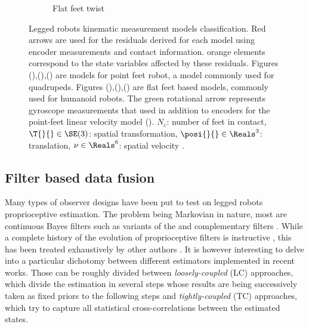 \begin{figure}
\begin{subfigure}{.33\linewidth}
        \caption{Flat feet twist}
        \label{fig:kin_flat_vel}
    \end{subfigure}%
    \caption{Legged robots kinematic measurement models classification. Red arrows are used for the residuals derived for each model using encoder measurements and contact information. 
    orange elements correspond to the state variables affected by these residuals. Figures (),(),() are models
    for point feet robot, a model commonly used for quadrupeds. Figures (),(),() are flat feet based models,
    commonly used for humanoid robots. The green rotational arrow represents gyroscope measurements that used in addition to encoders for the point-feet linear velocity model ().
    $N_c$: number of feet in contact, $\T{}{} \in \SE(3)$: spatial transformation, $\posi{}{} \in \Reals^3$: translation, $\nu \in \Reals^6$: spatial velocity \cite{featherstone2014rigid}. 
        }
    \label{fig:kin_models}
\end{figure}


\subsection{Filter based data fusion}
\label{sec:proprio_filters}

Many types of observer designs have been put to test on legged robots proprioceptive estimation. The problem being Markovian in nature,
most are continuous Bayes filters such as variants of the \KalmanF \cite{kalman1960new} and complementary filters \cite{higgins1975comparison}. While a complete history of 
the evolution of proprioceptive filters is instructive 
\cite{gassmann2005localization, lin2005leg, lin2006sensor, cobano2008location, aoustin2008experimental, lebastard2011estimation, chilian2011multisensor, reinstein2011dead, 
gur2012model, ma2012robust, gorner2013leg}, 
this has been treated exhaustively by other authors \cite{bloesch2017state, camurri2017multisensory}. 
It is however interesting to delve into a particular dichotomy between different estimators implemented in recent works. Those can be 
roughly divided between \textit{loosely-coupled} (LC) approaches, which divide the estimation in several steps whose results are being successively taken as fixed priors to the 
following steps and \textit{tightly-coupled} (TC) approaches, which try to capture all statistical cross-correlations between the estimated states.

